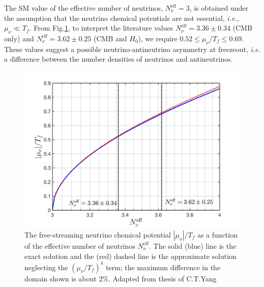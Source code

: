 The SM value of the effective number of neutrinos, $N_\nu^{\mathrm{eff}}=3$, is obtained under the assumption that the neutrino chemical potentials are not essential, {\it i.e.\/}, $\mu_\nu\ll T_f$. From Fig.\;\ref{Chemical_Potential_Neff}, to interpret the literature values $N_\nu^{\mathrm{eff}}=3.36\pm0.34$ (CMB only) and $N_\nu^{\mathrm{eff}}= 3.62\pm0.25$ (CMB and $H_0$), we require $0.52\leqslant\mu_\nu/T_f\leqslant0.69$. These values suggest  a possible neutrino-antineutrino asymmetry at freezeout, {\it i.e.\/} a difference between the number densities of neutrinos and antineutrinos.
\begin{figure}[t]
\begin{center}
\includegraphics[width=\textwidth]{./plots/Chemical_Potential_Neff}
\caption{The free-streaming neutrino chemical potential $|\mu_\nu|/T_f$ as a function of the effective number of neutrinos $N_\nu^{\mathrm{eff}}$. The solid (blue) line is the exact solution and the (red) dashed line is the approximate solution neglecting the $(\mu_\nu/T_f)^4$ term; the maximum difference in the domain shown is about $2\%$. Adapted from  thesis of C.T.Yang \cite{Yang:2024ret}}
\label{Chemical_Potential_Neff}
\end{center}
\end{figure}



